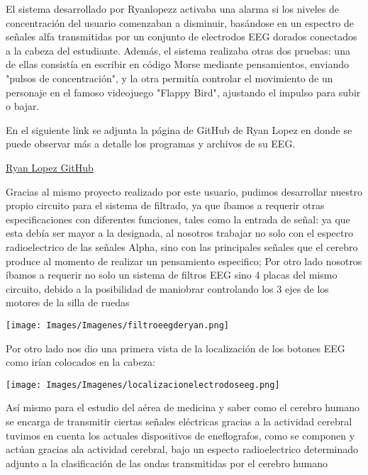 \documentclass{article}
\begin{document}
El sistema desarrollado por Ryanlopezz activaba una alarma si los niveles de concentración del usuario comenzaban a disminuir, basándose en un espectro de señales alfa transmitidas por un conjunto de electrodos EEG dorados conectados a la cabeza del estudiante. Además, el sistema realizaba otras dos pruebas: una de ellas consistía en escribir en código Morse mediante pensamientos, enviando "pulsos de concentración", y la otra permitía controlar el movimiento de un personaje en el famoso videojuego "Flappy Bird", ajustando el impulso para subir o bajar.

En el siguiente link se adjunta la página de GitHub de Ryan Lopez en donde se puede observar más a detalle los programas y archivos de su EEG.


\begin{center}
    \href{https://github.com/ryanlopezzzz/EEG}{Ryan Lopez GitHub}
\end{center}


Gracias al mismo proyecto realizado por este usuario, pudimos desarrollar nuestro propio circuito para el sistema de filtrado, ya que íbamos a requerir otras especificaciones con diferentes funciones, tales como la entrada de señal: ya que esta debía ser mayor a la designada, al nosotros trabajar no solo con el espectro radioelectrico de las señales Alpha, sino con las principales señales que el cerebro produce al momento de realizar un pensamiento especifico; Por otro lado nosotros íbamos a requerir no solo un sistema de filtros EEG sino 4 placas del mismo circuito, debido a la posibilidad de maniobrar controlando los 3 ejes de los motores de la silla de ruedas


\begin{center}
    \texttt{[image: Images/Imagenes/filtroeegderyan.png]}\\
\end{center}

Por otro lado nos dio una primera vista de la localización de los botones EEG como irían colocados en la cabeza:

\begin{center}
    \texttt{[image: Images/Imagenes/localizacionelectrodoseeg.png]}\\

\end{center}

Así mismo para el estudio del aérea de medicina y saber como el cerebro humano se encarga de transmitir ciertas señales eléctricas gracias a la actividad cerebral  tuvimos en cuenta los actuales dispositivos de eneflografos, como se componen y actúan gracias ala actividad cerebral, bajo un especto radioelectrico determinado adjunto a la clasificación de las ondas transmitidas por el cerebro humano
\end{document}
